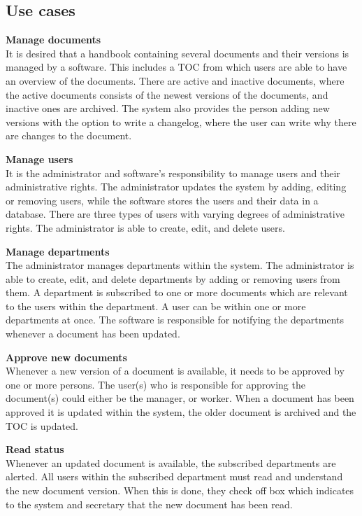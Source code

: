 \subsection{Use cases} \label{sec:usecases}
\textbf{Manage documents}
\\
It is desired that a handbook containing several documents and their versions is managed by a software.
This includes a TOC from which users are able to have an overview of the documents.
There are active and inactive documents, where the active documents consists of the newest versions of the documents, and inactive ones are archived.
The system also provides the person adding new versions with the option to write a changelog, where the user can write why there are changes to the document.

\textbf{Manage users}
\\
It is the administrator and software's responsibility to manage users and their administrative rights.
The administrator updates the system by adding, editing or removing users, while the software stores the users and their data in a database.
There are three types of users with varying degrees of administrative rights.
The administrator is able to create, edit, and delete users.

\textbf{Manage departments}
\\
The administrator manages departments within the system.
The administrator is able to create, edit, and delete departments by adding or removing users from them.
A department is subscribed to one or more documents which are relevant to the users within the department.
A user can be within one or more departments at once.
The software is responsible for notifying the departments whenever a document has been updated.

\textbf{Approve new documents}
\\
Whenever a new version of a document is available, it needs to be approved by one or more persons.
The user(s) who is responsible for approving the document(s) could either be the manager, or worker.
When a document has been approved it is updated within the system, the older document is archived and the TOC is updated.

\textbf{Read status}
\\
Whenever an updated document is available, the subscribed departments are alerted.
All users within the subscribed department must read and understand the new document version.
When this is done, they check off box which indicates to the system and secretary that the new document has been read.
